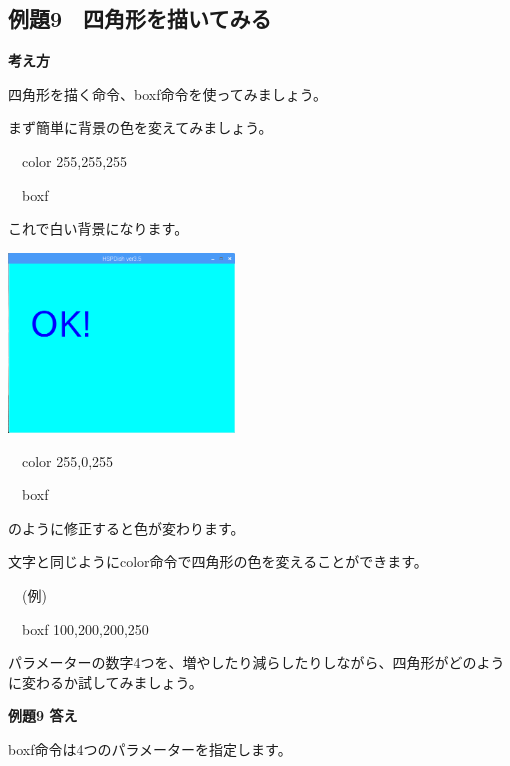 \documentclass[a4paper,12pt]{jarticle}
\begin{document}
\clearpage
\subsection{例題9　四角形を描いてみる}
\bigskip
\bigskip

{\bfseries
考え方}

\bigskip

四角形を描く命令、boxf命令を使ってみましょう。

まず簡単に背景の色を変えてみましょう。

\ \ color 255,255,255

\ \ boxf

これで白い背景になります。

\bigskip
\bigskip

\begin{minipage}{9.781cm}
\centering
{\upshape
\includegraphics[keepaspectratio,width=6.006cm,height=4.77cm]{text02-img/text02-img036.png}}
\end{minipage}

\bigskip
\bigskip
\bigskip

\ \ color 255,0,255

\ \ boxf

\bigskip

のように修正すると色が変わります。

文字と同じようにcolor命令で四角形の色を変えることができます。

\bigskip

\ \ (例)

\ \ boxf 100,200,200,250


\bigskip

パラメーターの数字4つを、増やしたり減らしたりしながら、四角形がどのように変わるか試してみましょう。


\bigskip


\bigskip

{\bfseries
例題9 答え}

\bigskip

boxf命令は4つのパラメーターを指定します。
\end{document}
